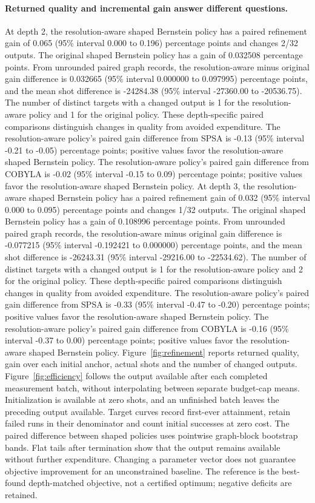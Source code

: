 \paragraph{Returned quality and incremental gain answer different questions.}
At depth 2, the resolution-aware shaped Bernstein policy has a paired refinement gain of 0.065 (95\% interval 0.000 to 0.196) percentage points and changes 2/32 outputs.
The original shaped Bernstein policy has a gain of 0.032508 percentage points. From unrounded paired graph records, the resolution-aware minus original gain difference is 0.032665 (95\% interval 0.000000 to 0.097995) percentage points, and the mean shot difference is -24284.38 (95\% interval -27360.00 to -20536.75). The number of distinct targets with a changed output is 1 for the resolution-aware policy and 1 for the original policy. These depth-specific paired comparisons distinguish changes in quality from avoided expenditure.
The resolution-aware policy's paired gain difference from SPSA is -0.13 (95\% interval -0.21 to -0.05) percentage points; positive values favor the resolution-aware shaped Bernstein policy.
The resolution-aware policy's paired gain difference from COBYLA is -0.02 (95\% interval -0.15 to 0.09) percentage points; positive values favor the resolution-aware shaped Bernstein policy.
At depth 3, the resolution-aware shaped Bernstein policy has a paired refinement gain of 0.032 (95\% interval 0.000 to 0.095) percentage points and changes 1/32 outputs.
The original shaped Bernstein policy has a gain of 0.108996 percentage points. From unrounded paired graph records, the resolution-aware minus original gain difference is -0.077215 (95\% interval -0.192421 to 0.000000) percentage points, and the mean shot difference is -26243.31 (95\% interval -29216.00 to -22534.62). The number of distinct targets with a changed output is 1 for the resolution-aware policy and 2 for the original policy. These depth-specific paired comparisons distinguish changes in quality from avoided expenditure.
The resolution-aware policy's paired gain difference from SPSA is -0.33 (95\% interval -0.47 to -0.20) percentage points; positive values favor the resolution-aware shaped Bernstein policy.
The resolution-aware policy's paired gain difference from COBYLA is -0.16 (95\% interval -0.37 to 0.00) percentage points; positive values favor the resolution-aware shaped Bernstein policy.
Figure~\ref{fig:refinement} reports returned quality, gain over each initial anchor, actual shots and the number of changed outputs. Figure~\ref{fig:efficiency} follows the output available after each completed measurement batch, without interpolating between separate budget-cap means. Initialization is available at zero shots, and an unfinished batch leaves the preceding output available. Target curves record first-ever attainment, retain failed runs in their denominator and count initial successes at zero cost. The paired difference between shaped policies uses pointwise graph-block bootstrap bands. Flat tails after termination show that the output remains available without further expenditure. Changing a parameter vector does not guarantee objective improvement for an unconstrained baseline. The reference is the best-found depth-matched objective, not a certified optimum; negative deficits are retained.
